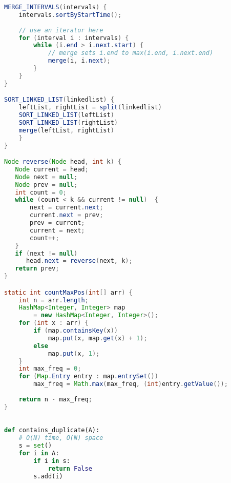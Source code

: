 \documentclass{article}
\begin{document}
\begin{lstlisting}[language=Java]
MERGE_INTERVALS(intervals) {
    intervals.sortByStartTime();
    
    // use an iterator here
    for (interval i : intervals) {
        while (i.end > i.next.start) {
            // merge sets i.end to max(i.end, i.next.end)
            merge(i, i.next);
        }
    }
}

SORT_LINKED_LIST(linkedlist) {
    leftList, rightList = split(linkedlist)
    SORT_LINKED_LIST(leftList)
    SORT_LINKED_LIST(rightList)
    merge(leftList, rightList)
    }
}

Node reverse(Node head, int k) { 
   Node current = head; 
   Node next = null; 
   Node prev = null; 
   int count = 0; 
   while (count < k && current != null)  { 
       next = current.next; 
       current.next = prev; 
       prev = current; 
       current = next; 
       count++; 
   } 
   if (next != null)  
      head.next = reverse(next, k); 
   return prev; 
}

static int countMaxPos(int[] arr) { 
    int n = arr.length; 
    HashMap<Integer, Integer> map 
        = new HashMap<Integer, Integer>(); 
    for (int x : arr) { 
        if (map.containsKey(x)) 
            map.put(x, map.get(x) + 1); 
        else
            map.put(x, 1); 
    } 
    int max_freq = 0; 
    for (Map.Entry entry : map.entrySet()) 
        max_freq = Math.max(max_freq, (int)entry.getValue()); 
    
    return n - max_freq; 
} 

\end{lstlisting}

\begin{lstlisting}[language=Python]

def contains_duplicate(A):
    # O(N) time, O(N) space
    s = set()
    for i in A:
        if i in s:
            return False
        s.add(i)

\end{lstlisting}
\end{document}
